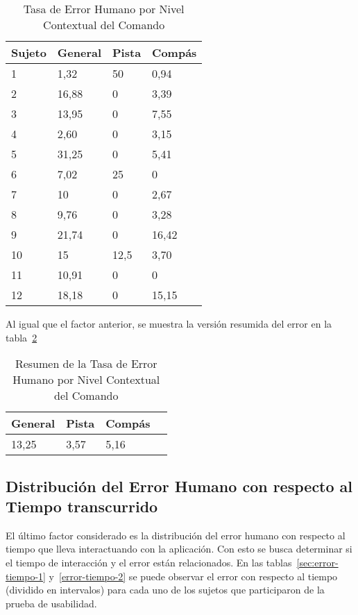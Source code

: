 \begin{table}[H]
\centering
\footnotesize
\begin{tabular}{|p{1.6cm}|p{1.6cm}|p{1.6cm}|p{1.6cm}|}
\hline
    Sujeto & General & Pista & Comp\'as \\
    \hline
1 & 1,32  & 50     & 0,94 \\
2 & 16,88 & 0      & 3,39 \\
3 & 13,95 & 0      & 7,55 \\
4 & 2,60 & 0      & 3,15 \\
5 & 31,25 & 0      & 5,41 \\
6 & 7,02 & 25     & 0 \\
7 & 10     & 0      & 2,67 \\
8 & 9,76 & 0      & 3,28 \\
9 & 21,74 & 0      & 16,42 \\
10 & 15     & 12,5 & 3,70 \\
11 & 10,91 & 0      & 0 \\
12 & 18,18 & 0      & 15,15 \\
    \hline
\end{tabular}
\caption{Tasa de Error Humano por Nivel Contextual del Comando}
\label{sec:error-contexto}
\end{table}

Al igual que el factor anterior, se muestra la versi\'on resumida del error en la 
tabla~\ref{sec:error-contexto-resumen}

\begin{table}[H]
\centering
\footnotesize
\begin{tabular}{|p{1.6cm}|p{1.6cm}|p{1.6cm}|p{1.6cm}|}
\hline
    General & Pista & Comp\'as \\
    \hline
    13,25 & 3,57 & 5,16 \\
    \hline
\end{tabular}
\caption{Resumen de la Tasa de Error Humano por Nivel Contextual del Comando}
\label{sec:error-contexto-resumen}
\end{table}

\subsection{Distribuci\'on del Error Humano con respecto al Tiempo transcurrido}

El \'ultimo factor considerado es la distribución del error humano con respecto al tiempo 
que lleva interactuando con la aplicaci\'on. Con esto se busca determinar si el tiempo de interacci\'on 
y el error est\'an relacionados. En las tablas~\ref{sec:error-tiempo-1} y~\ref{error-tiempo-2} se puede observar
el error con respecto al tiempo (dividido en intervalos) para cada uno de los sujetos que participaron de la prueba de usabilidad.

